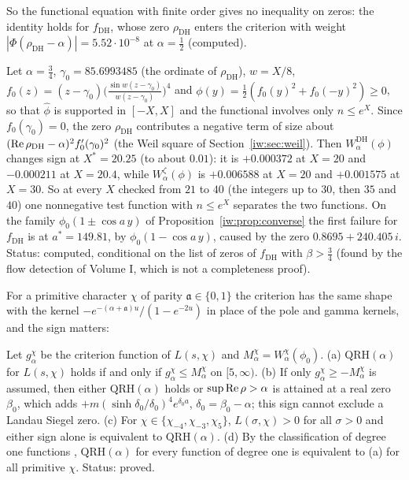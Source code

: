 So the functional equation with finite order gives no inequality on zeros: the identity holds for $f_{\mathrm{DH}}$, whose zero $\rho_{\mathrm{DH}}$ enters the criterion with weight $|\Phi(\rho_{\mathrm{DH}}-\alpha)|=5.52\cdot10^{-8}$ at $\alpha=\frac12$ (computed).

\begin{remark}\label{rg:rem:separate}
Let $\alpha=\frac34$, $\gamma_0=85.6993485$ (the ordinate of $\rho_{\mathrm{DH}}$), $w=X/8$, $f_0(z)=(z-\gamma_0)\big(\frac{\sin w(z-\gamma_0)}{w(z-\gamma_0)}\big)^4$ and $\phi(y)=\frac12(f_0(y)^2+f_0(-y)^2)\ge0$, so that $\widehat\phi$ is supported in $[-X,X]$ and the functional involves only $n\le e^X$. Since $f_0(\gamma_0)=0$, the zero $\rho_{\mathrm{DH}}$ contributes a negative term of size about $(\operatorname{Re}\rho_{\mathrm{DH}}-\alpha)^2f_0'(\gamma_0)^2$ (the Weil square of Section~\ref{iw:sec:weil}). Then $W^{\mathrm{DH}}_\alpha(\phi)$ changes sign at $X^*=20.25$ (to about $0.01$): it is $+0.000372$ at $X=20$ and $-0.000211$ at $X=20.4$, while $W^\zeta_\alpha(\phi)$ is $+0.006588$ at $X=20$ and $+0.001575$ at $X=30$. So at every $X$ checked from $21$ to $40$ (the integers up to $30$, then $35$ and $40$) one nonnegative test function with $n\le e^X$ separates the two functions. On the family $\phi_0(1\pm\cos a\,y)$ of Proposition~\ref{iw:prop:converse} the first failure for $f_{\mathrm{DH}}$ is at $a^*=149.81$, by $\phi_0(1-\cos a\,y)$, caused by the zero $0.8695+240.405\,i$. Status: computed, conditional on the list of zeros of $f_{\mathrm{DH}}$ with $\beta>\frac34$ (found by the flow detection of Volume I, which is not a completeness proof).
\end{remark}

For a primitive character $\chi$ of parity $\mathfrak a\in\{0,1\}$ the criterion has the same shape with the kernel $-e^{-(\alpha+\mathfrak a)u}/(1-e^{-2u})$ in place of the pole and gamma kernels, and the sign matters:

\begin{proposition}\label{rg:prop:dirichlet}
Let $g^\chi_\alpha$ be the criterion function of $L(s,\chi)$ and $M^\chi_\alpha=W^\chi_\alpha(\phi_0)$. (a) $\mathrm{QRH}(\alpha)$ for $L(s,\chi)$ holds if and only if $g^\chi_\alpha\le M^\chi_\alpha$ on $[5,\infty)$. (b) If only $g^\chi_\alpha\ge-M^\chi_\alpha$ is assumed, then either $\mathrm{QRH}(\alpha)$ holds or $\sup\operatorname{Re}\rho>\alpha$ is attained at a real zero $\beta_0$, which adds $+m(\sinh\delta_0/\delta_0)^4e^{\delta_0a}$, $\delta_0=\beta_0-\alpha$; this sign cannot exclude a Landau Siegel zero. (c) For $\chi\in\{\chi_{-4},\chi_{-3},\chi_5\}$, $L(\sigma,\chi)>0$ for all $\sigma>0$ and either sign alone is equivalent to $\mathrm{QRH}(\alpha)$. (d) By the classification of degree one functions \cite{NCKP99}, $\mathrm{QRH}(\alpha)$ for every function of degree one is equivalent to (a) for all primitive $\chi$. Status: proved.
\end{proposition}

